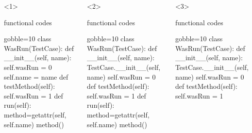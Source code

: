 \documentclass[lualatex]{beamer}
\begin{document}
\begin{frame}[fragile,t]
\begin{columns}[t]
    \begin{onlyenv}<1>
      \begin{block}{functional codes}
        \begin{pythoncode*}{gobble=10}
          class WasRun(TestCase):
            def __init__(self, name):
              self.wasRun = 0
              self.name = name
            def testMethod(self):
              self.wasRun = 1
            def run(self):
              method=getattr(self, self.name)
              method()
        \end{pythoncode*}
      \end{block}
    \end{onlyenv}
    \begin{onlyenv}<2>
      \begin{block}{functional codes}
        \begin{pythoncode*}{gobble=10}
          class WasRun(TestCase):
            def __init__(self, name):
              TestCase.__init__(self, name)
              self.wasRun = 0
            def testMethod(self):
              self.wasRun = 1
            def run(self):
              method=getattr(self, self.name)
              method()
        \end{pythoncode*}
      \end{block}
    \end{onlyenv}
    \begin{onlyenv}<3>
      \begin{block}{functional codes}
        \begin{pythoncode*}{gobble=10}
          class WasRun(TestCase):
            def __init__(self, name):
              TestCase.__init__(self, name)
              self.wasRun = 0
            def testMethod(self):
              self.wasRun = 1
        \end{pythoncode*}
      \end{block}
    \end{onlyenv}
  \end{columns}

\end{frame}
\end{document}
